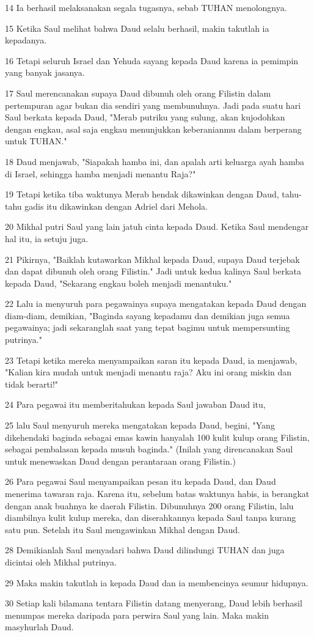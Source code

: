 \par 14 Ia berhasil melaksanakan segala tugasnya, sebab TUHAN menolongnya.
\par 15 Ketika Saul melihat bahwa Daud selalu berhasil, makin takutlah ia kepadanya.
\par 16 Tetapi seluruh Israel dan Yehuda sayang kepada Daud karena ia pemimpin yang banyak jasanya.
\par 17 Saul merencanakan supaya Daud dibunuh oleh orang Filistin dalam pertempuran agar bukan dia sendiri yang membunuhnya. Jadi pada suatu hari Saul berkata kepada Daud, "Merab putriku yang sulung, akan kujodohkan dengan engkau, asal saja engkau menunjukkan keberanianmu dalam berperang untuk TUHAN."
\par 18 Daud menjawab, "Siapakah hamba ini, dan apalah arti keluarga ayah hamba di Israel, sehingga hamba menjadi menantu Raja?"
\par 19 Tetapi ketika tiba waktunya Merab hendak dikawinkan dengan Daud, tahu-tahu gadis itu dikawinkan dengan Adriel dari Mehola.
\par 20 Mikhal putri Saul yang lain jatuh cinta kepada Daud. Ketika Saul mendengar hal itu, ia setuju juga.
\par 21 Pikirnya, "Baiklah kutawarkan Mikhal kepada Daud, supaya Daud terjebak dan dapat dibunuh oleh orang Filistin." Jadi untuk kedua kalinya Saul berkata kepada Daud, "Sekarang engkau boleh menjadi menantuku."
\par 22 Lalu ia menyuruh para pegawainya supaya mengatakan kepada Daud dengan diam-diam, demikian, "Baginda sayang kepadamu dan demikian juga semua pegawainya; jadi sekaranglah saat yang tepat bagimu untuk mempersunting putrinya."
\par 23 Tetapi ketika mereka menyampaikan saran itu kepada Daud, ia menjawab, "Kalian kira mudah untuk menjadi menantu raja? Aku ini orang miskin dan tidak berarti!"
\par 24 Para pegawai itu memberitahukan kepada Saul jawaban Daud itu,
\par 25 lalu Saul menyuruh mereka mengatakan kepada Daud, begini, "Yang dikehendaki baginda sebagai emas kawin hanyalah 100 kulit kulup orang Filistin, sebagai pembalasan kepada musuh baginda." (Inilah yang direncanakan Saul untuk menewaskan Daud dengan perantaraan orang Filistin.)
\par 26 Para pegawai Saul menyampaikan pesan itu kepada Daud, dan Daud menerima tawaran raja. Karena itu, sebelum batas waktunya habis, ia berangkat dengan anak buahnya ke daerah Filistin. Dibunuhnya 200 orang Filistin, lalu diambilnya kulit kulup mereka, dan diserahkannya kepada Saul tanpa kurang satu pun. Setelah itu Saul mengawinkan Mikhal dengan Daud.
\par 28 Demikianlah Saul menyadari bahwa Daud dilindungi TUHAN dan juga dicintai oleh Mikhal putrinya.
\par 29 Maka makin takutlah ia kepada Daud dan ia membencinya seumur hidupnya.
\par 30 Setiap kali bilamana tentara Filistin datang menyerang, Daud lebih berhasil menumpas mereka daripada para perwira Saul yang lain. Maka makin masyhurlah Daud.

